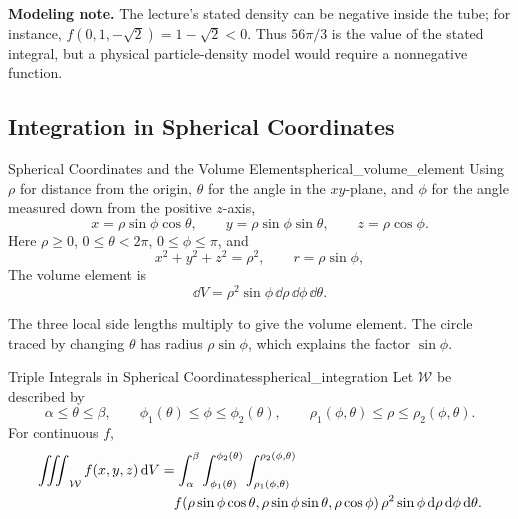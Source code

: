 \textbf{Modeling note.} The lecture's stated density can be negative inside the tube; for instance, $f(0,1,-\sqrt{2}) = 1 - \sqrt{2} < 0$. Thus $56\pi/3$ is the value of the stated integral, but a physical particle-density model would require a nonnegative function.

\clearpage
\subsection{Integration in Spherical Coordinates}

\begin{definition}{Spherical Coordinates and the Volume Element}{spherical_volume_element}
Using $\rho$ for distance from the origin, $\theta$ for the angle in the $xy$-plane, and $\phi$ for the angle measured down from the positive $z$-axis,
\[
    x = \rho\sin\phi\cos\theta,\qquad
    y = \rho\sin\phi\sin\theta,\qquad
    z = \rho\cos\phi.
\]
Here $\rho \geq 0$, $0 \leq \theta < 2\pi$, $0 \leq \phi \leq \pi$, and
\[
    x^2 + y^2 + z^2 = \rho^2,\qquad r = \rho\sin\phi,
\]
The volume element is
\[
    \boxed{\dd{V} = \rho^2\sin\phi\,\dd{\rho}\,\dd{\phi}\,\dd{\theta}}.
\]
\end{definition}

\noindent
\begin{minipage}[c]{0.53\textwidth}
The three local side lengths multiply to give the volume element. The circle traced by changing $\theta$ has radius $\rho\sin\phi$, which explains the factor $\sin\phi$.
\end{minipage}\hfill
\begin{minipage}[c]{0.44\textwidth}
\centering

\end{minipage}

\begin{theorem}{Triple Integrals in Spherical Coordinates}{spherical_integration}
Let $\mathcal{W}$ be described by
\[
    \alpha \leq \theta \leq \beta,\qquad
    \phi_1(\theta) \leq \phi \leq \phi_2(\theta),\qquad
    \rho_1(\phi,\theta) \leq \rho \leq \rho_2(\phi,\theta).
\]
For continuous $f$,
\begin{align*}
    \mathop{\int\mkern-10mu\int\mkern-10mu\int}\nolimits_{\mathcal{W}} f(x,y,z) \, \mathrm{d}V
    &= \int_\alpha^\beta\int_{\phi_1(\theta)}^{\phi_2(\theta)}
    \int_{\rho_1(\phi,\theta)}^{\rho_2(\phi,\theta)}\\
    &\quad f(\rho\sin\phi\cos\theta,\rho\sin\phi\sin\theta,\rho\cos\phi)
    \,\rho^2\sin\phi\,\mathrm{d}\rho\,\mathrm{d}\phi\,\mathrm{d}\theta.
\end{align*}
\end{theorem}



